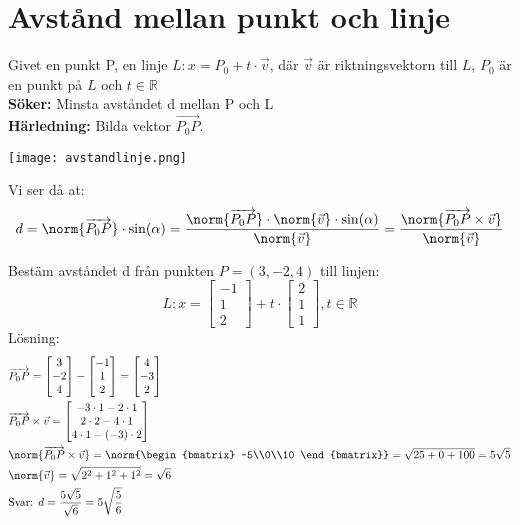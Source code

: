 \section{Avstånd mellan punkt och linje} %
\label{sec:avst_nd_mellan_punkt_och_linje}
Givet en punkt P, en linje $L:x = P_0 + t \cdot \vec{v}$, där $\vec{v}$ är riktningsvektorn till $L$, $P_0$ är en punkt på $L$ och $t \in \mathbb{R}$\\
\textbf{Söker:} Minsta avståndet d mellan P och L\\
\textbf{Härledning:} Bilda vektor $\overrightarrow{P_0P}$. 
\begin{center}
	\texttt{[image: avstandlinje.png]}
\end{center}
Vi ser då at:
\[
    d = \norm{\overrightarrow{P_0P}} \cdot \sin(\alpha) = \frac{\norm{\overrightarrow{P_0P}} \cdot \norm{\vec{v}} \cdot \sin(\alpha)}{\norm{\vec{v}}} = \frac{\norm{\overrightarrow{P_0P} \times \vec{v}}}{\norm{\vec{v}}}
\]
\begin{Ex}
    Bestäm avståndet d från punkten $P=(3,-2,4)$ till linjen:
    \[
        L:x = \begin{bmatrix} -1\\1\\2 \end{bmatrix} + t \cdot \begin{bmatrix} 2\\1\\1 \end{bmatrix}, t \in \mathbb{R}
    \]
    Lösning:
    \begin{align*}
    	&\overrightarrow{P_0P} = \begin{bmatrix} 3\\-2\\4 \end{bmatrix} - \begin{bmatrix} -1\\1\\2 \end{bmatrix} = \begin{bmatrix} 4\\-3\\2 \end{bmatrix}\\
    	&\overrightarrow{P_0P} \times \vec{v} = \begin{bmatrix} -3 \cdot 1 - 2 \cdot 1\\2 \cdot 2 - 4 \cdot 1\\4 \cdot 1 - (-3) \cdot 2 \end{bmatrix}\\
    	&\norm{\overrightarrow{P_0P} \times \vec{v}} = \norm{\begin{bmatrix} -5\\0\\10 \end{bmatrix}} = \sqrt{25+0+100} = 5 \sqrt{5}\\
    	&\norm{\vec{v}} = \sqrt{2^2+1^2+1^2} = \sqrt{6}\\
    	&\mbox{Svar: } d = \frac{5\sqrt{5}}{\sqrt{6}} = 5 \sqrt{\frac{5}{6}}
    \end{align*}
\end{Ex}

